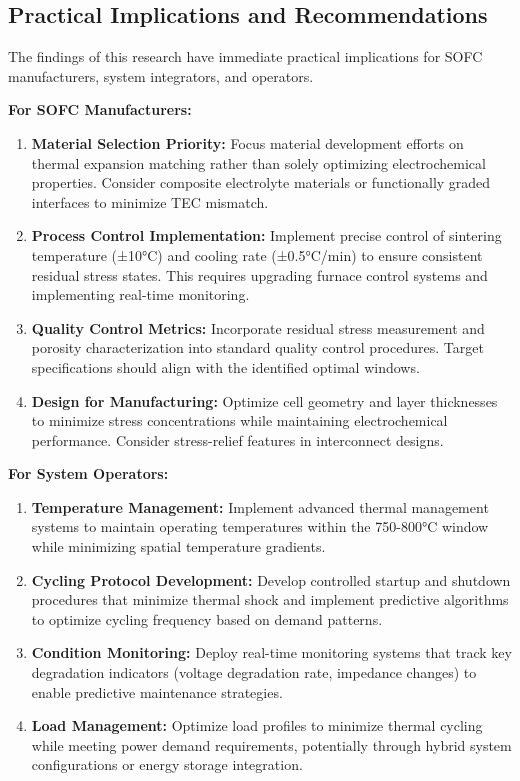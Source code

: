 \documentclass[conference]{IEEEtran}
\begin{document}
\subsection{Practical Implications and Recommendations}

The findings of this research have immediate practical implications for SOFC manufacturers, system integrators, and operators.

\textbf{For SOFC Manufacturers:}

\begin{enumerate}
\item \textbf{Material Selection Priority:} Focus material development efforts on thermal expansion matching rather than solely optimizing electrochemical properties. Consider composite electrolyte materials or functionally graded interfaces to minimize TEC mismatch.

\item \textbf{Process Control Implementation:} Implement precise control of sintering temperature (±10°C) and cooling rate (±0.5°C/min) to ensure consistent residual stress states. This requires upgrading furnace control systems and implementing real-time monitoring.

\item \textbf{Quality Control Metrics:} Incorporate residual stress measurement and porosity characterization into standard quality control procedures. Target specifications should align with the identified optimal windows.

\item \textbf{Design for Manufacturing:} Optimize cell geometry and layer thicknesses to minimize stress concentrations while maintaining electrochemical performance. Consider stress-relief features in interconnect designs.
\end{enumerate}

\textbf{For System Operators:}

\begin{enumerate}
\item \textbf{Temperature Management:} Implement advanced thermal management systems to maintain operating temperatures within the 750-800°C window while minimizing spatial temperature gradients.

\item \textbf{Cycling Protocol Development:} Develop controlled startup and shutdown procedures that minimize thermal shock and implement predictive algorithms to optimize cycling frequency based on demand patterns.

\item \textbf{Condition Monitoring:} Deploy real-time monitoring systems that track key degradation indicators (voltage degradation rate, impedance changes) to enable predictive maintenance strategies.

\item \textbf{Load Management:} Optimize load profiles to minimize thermal cycling while meeting power demand requirements, potentially through hybrid system configurations or energy storage integration.
\end{enumerate}
\end{document}
